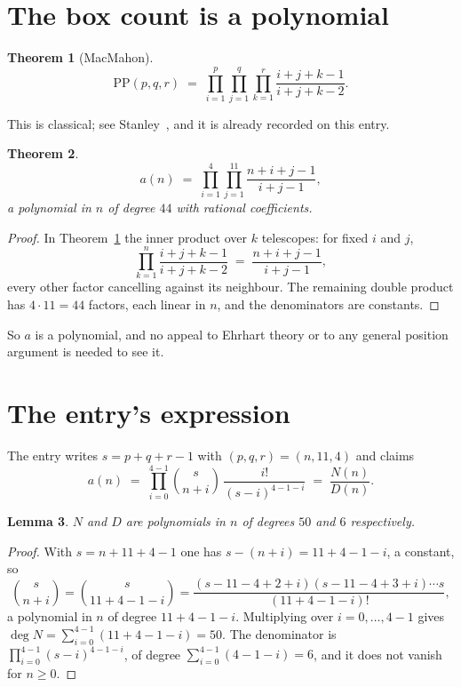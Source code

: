 \documentclass[11pt,a4paper]{article}
\theoremstyle{plain}
\newtheorem{theorem}{Theorem}
\newtheorem{lemma}[theorem]{Lemma}
\theoremstyle{definition}
\begin{document}
\section{The box count is a polynomial}

\begin{theorem}[MacMahon]\label{thm:mm}
\[
\mathrm{PP}(p,q,r)\;=\;\prod_{i=1}^{p}\prod_{j=1}^{q}\prod_{k=1}^{r}
\frac{i+j+k-1}{i+j+k-2} .
\]
\end{theorem}

This is classical; see Stanley~\cite{stanley}, and it is already recorded on this entry.

\begin{theorem}\label{thm:poly}
\[
a(n)\;=\;\prod_{i=1}^{4}\prod_{j=1}^{11}\frac{n+i+j-1}{i+j-1},
\]
a polynomial in $n$ of degree $44$ with rational coefficients.
\end{theorem}

\begin{proof}
In Theorem~\ref{thm:mm} the inner product over $k$ telescopes: for fixed $i$ and $j$,
\[
\prod_{k=1}^{n}\frac{i+j+k-1}{i+j+k-2}\;=\;\frac{n+i+j-1}{i+j-1} ,
\]
every other factor cancelling against its neighbour. The remaining double product has
$4\cdot11=44$ factors, each linear in $n$, and the denominators are constants.
\end{proof}

So $a$ is a polynomial, and no appeal to Ehrhart theory or to any general position argument is
needed to see it.

\section{The entry's expression}

The entry writes $s=p+q+r-1$ with $(p,q,r)=(n,11,4)$ and claims
\[
a(n)\;=\;\prod_{i=0}^{4-1}\binom{s}{n+i}\,\frac{i!}{(s-i)^{4-1-i}}\;=\;
\frac{N(n)}{D(n)} .
\]

\begin{lemma}\label{lem:deg}
$N$ and $D$ are polynomials in $n$ of degrees $50$ and $6$ respectively.
\end{lemma}

\begin{proof}
With $s=n+11+4-1$ one has $s-(n+i)=11+4-1-i$, a constant, so
\[
\binom{s}{n+i}=\binom{s}{11+4-1-i}
=\frac{(s-11-4+2+i)(s-11-4+3+i)\cdots s}{(11+4-1-i)!},
\]
a polynomial in $n$ of degree $11+4-1-i$. Multiplying over $i=0,\dots,4-1$ gives
$\deg N=\sum_{i=0}^{4-1}(11+4-1-i)=50$. The denominator is
$\prod_{i=0}^{4-1}(s-i)^{4-1-i}$, of degree
$\sum_{i=0}^{4-1}(4-1-i)=6$, and it does not vanish for $n\ge0$.
\end{proof}
\end{document}
